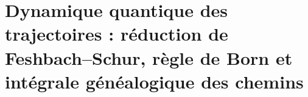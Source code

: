 \chapter{Dynamique quantique des trajectoires : réduction de Feshbach--Schur, règle de Born et intégrale généalogique des chemins}
\label{chap:md-trayectorias-cuanticas-definitivo}


\begingroup
\let\HMTOwnerSection\section
\let\HMTOwnerSubsection\subsection
\let\HMTOwnerSubsubsection\subsubsection
\let\HMTOwnerParagraph\paragraph
\let\chapter\HMTOwnerSection
\let\section\HMTOwnerSubsection
\let\subsection\HMTOwnerSubsubsection
\let\subsubsection\HMTOwnerParagraph

\endgroup
\begingroup
\let\HMTOwnerSection\section
\let\HMTOwnerSubsection\subsection
